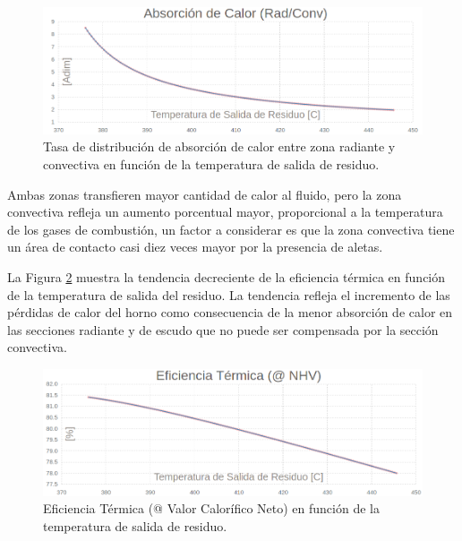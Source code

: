 \begin{figure}[H] \begin{center}
\includegraphics[scale=0.46]{images/graph-t_out-dist}
\caption[Distribución de absorción de calor en función de Temperatura de salida de residuo]{Tasa de distribución de absorción de calor entre zona radiante y convectiva en función de la temperatura de salida de residuo.}
\label{fig:graph-t_out-dist} \end{center} \end{figure}
\par Ambas zonas transfieren mayor cantidad de calor al fluido, pero la zona convectiva refleja un aumento porcentual mayor, proporcional a la temperatura de los gases de combustión, un factor a considerar es que la zona convectiva tiene un área de contacto casi diez veces mayor por la presencia de aletas.
\par La Figura \ref{fig:graph-t_out-efic} muestra la tendencia decreciente de la eficiencia térmica en función de la temperatura de salida del residuo. La tendencia refleja el incremento de las pérdidas de calor del horno como consecuencia de la menor absorción de calor en las secciones radiante y de escudo que no puede ser compensada por la sección convectiva. 
\begin{figure}[H]\begin{center}
\includegraphics[scale=0.46]{images/graph-t_out-efic}
\caption[Eficiencia térmica en función de Temperatura de salida de residuo]{Eficiencia Térmica (@ Valor Calorífico Neto) en función de la temperatura de salida de residuo.}
\label{fig:graph-t_out-efic}\end{center}\end{figure}
